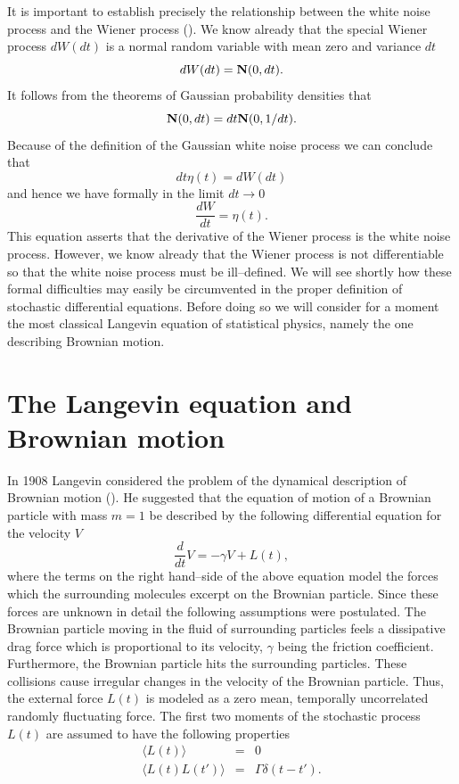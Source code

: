 It is important to establish precisely the relationship
between the white noise process and the Wiener process
(\cite{GILLESPIE}).
We know already that the special Wiener process $dW(dt)$
is a normal random variable with mean zero and variance $dt$
\begin{equation*}
dW(dt) = {\bf N}(0,dt).
\end{equation*}
It follows from the theorems of Gaussian probability densities
that
\begin{equation*}
{\bf N}(0,dt) =  dt {\bf N}(0,1/dt).
\end{equation*}
Because of the definition of the Gaussian white noise process we 
can conclude that
\begin{equation*}
dt \eta(t) = dW(dt)
\end{equation*}
and hence we have formally in the limit $dt \rightarrow 0$
\begin{equation*}
\frac{dW}{dt} = \eta(t).
\end{equation*}
This equation asserts that the derivative of the Wiener process is 
the white noise process. However, we know already that the Wiener
process is not differentiable so that the white noise process must 
be ill--defined. We will see shortly how these formal difficulties 
may easily be circumvented in the proper definition
of stochastic differential equations. Before doing so we will 
consider for a 
moment the most classical Langevin equation of statistical 
physics, namely the one describing Brownian motion.

\section{The Langevin equation and Brownian motion}
In 1908 Langevin considered the problem of the dynamical 
description of Brownian motion (\cite{VAN_KAMPEN}). 
He suggested that the equation of 
motion of a Brownian particle with mass $m=1$ be described by the
following differential equation for the velocity $V$
\begin{equation}
\label{LANGEVIN}
\frac{d}{dt} V = -\gamma V + L(t),
\end{equation}
where the terms on the right hand--side of the above equation 
model the forces which the surrounding molecules excerpt on the 
Brownian particle. Since these forces are unknown in detail the 
following assumptions were postulated. The Brownian particle 
moving in the fluid of surrounding particles feels
a dissipative drag force which is proportional to its velocity, $\gamma$  being 
the friction coefficient. Furthermore, the Brownian particle hits
the surrounding particles. These collisions cause irregular 
changes in the velocity of the Brownian particle. Thus, the external force
$L(t)$ is modeled as a zero mean, temporally uncorrelated
randomly fluctuating force. The first two moments of the
stochastic process $L(t)$ are assumed to 
have the following properties
\begin{eqnarray*}
\langle L(t) \rangle &=& 0 \\
\langle L(t) L(t') \rangle &=& \Gamma \delta(t-t').
\end{eqnarray*}

